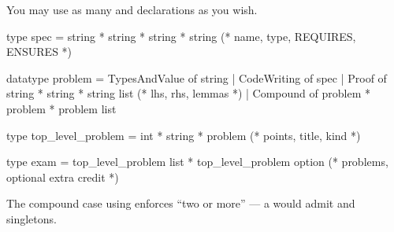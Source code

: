 \documentclass[addpoints,12pt]{exam}
\begin{document}
\begin{questions}
\begin{parts}
    You may use as many  and  declarations as
    you wish.

    \begin{solutionorbox}[40em]
      \begin{codeblock}
        type spec = string * string * string * string
          (* name, type, REQUIRES, ENSURES *)

        datatype problem =
            TypesAndValue of string
          | CodeWriting of spec
          | Proof of string * string * string list
              (* lhs, rhs, lemmas *)
          | Compound of problem * problem * problem list

        type top_level_problem = int * string * problem
          (* points, title, kind *)

        type exam = top_level_problem list
                  * top_level_problem option
          (* problems, optional extra credit *)
      \end{codeblock}

      The compound case using 
      enforces ``two or more'' --- a  would admit
      \code{[]} and singletons.
    \end{solutionorbox}
\end{parts}

\end{questions}
\end{document}
